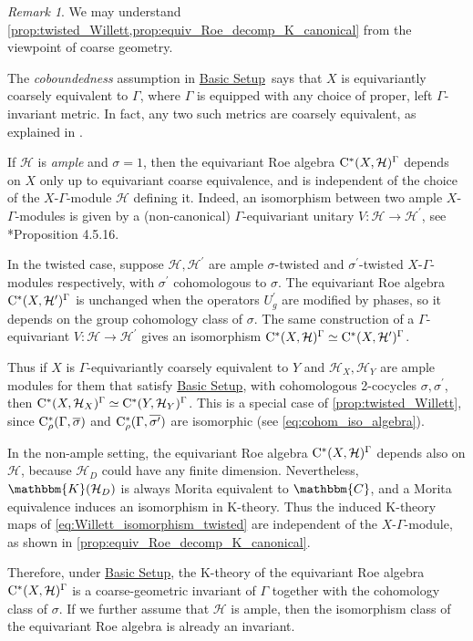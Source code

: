 \documentclass{amsart}
\numberwithin{figure}{section}
\numberwithin{equation}{section}
\numberwithin{table}{section}
\theoremstyle{plain}
\theoremstyle{definition}
\theoremstyle{remark}
\newtheorem{remark}[equation]{Remark}
\theoremstyle{nonumber}
\newcommand{\refbasicsetup}{\hyperref[basic_setup]{Basic Setup}}
\newcommand{\C}{\mathbb{C}}
\newcommand{\Cpt}{\mathbb{K}}
\newcommand{\Cst}{\relax\ifmmode\mathrm{C}^*\else\textup{C*}\fi}
\newcommand{\Cstr}{\Cst_\rho} %
\renewcommand{\mathbb}{\mathbbm} %
\begin{document}
\begin{remark}\label{rmk:equivariant_coarse_equivalence}
We may understand
\cref{prop:twisted_Willett,prop:equiv_Roe_decomp_K_canonical}
from the viewpoint of coarse geometry.

The \emph{coboundedness} assumption in \refbasicsetup\, says that \( X \) is
equivariantly coarsely equivalent to \( \Gamma \), where \( \Gamma \) is
equipped with any choice of proper, left \( \Gamma \)-invariant metric.
In fact, any two such metrics are coarsely equivalent, as explained in
\cite{Smith:Asymptotic_dimension_abelian_groups}.

If \( \mathcal{H} \) is \emph{ample} 
and $\sigma=1$, then the equivariant Roe algebra \(
\Cst(X,\mathcal{H})^\Gamma \) depends on \( X \) only up to equivariant
coarse equivalence, and is independent of the choice of the \( X \)-\(
\Gamma \)-module \( \mathcal{H} \) defining it. 
Indeed, an isomorphism between two ample \( X \)-\(
\Gamma \)-modules is given by a (non-canonical) \( \Gamma \)-equivariant
unitary $V\colon \mathcal{H}\to\mathcal{H}^\prime$, see
\cite{Willett-Yu:Higher_index_theory}*{Proposition 4.5.16}.

In the twisted case, suppose $\mathcal{H},\mathcal{H}^\prime$ are
ample $\sigma$-twisted and $\sigma^\prime$-twisted $X$-$\Gamma$-modules
respectively, with $\sigma^\prime$ cohomologous to $\sigma$. The
equivariant Roe algebra \( \Cst(X,\mathcal{H}^\prime)^\Gamma \) is
unchanged when the operators $U^\prime_g$ are modified by phases, so it depends on the group cohomology class of $\sigma$. The same construction of a
$\Gamma$-equivariant $V\colon \mathcal{H}\to \mathcal{H}^\prime$ gives an
isomorphism \(\Cst(X,\mathcal{H})^\Gamma \simeq
\Cst(X,\mathcal{H}^\prime)^\Gamma\). 

Thus if
\( X \) is \(\Gamma\)-equivariantly coarsely equivalent to \( Y \) and
\( \mathcal{H}_X, \mathcal{H}_Y\) are ample modules for them that satisfy
\refbasicsetup, with cohomologous 2-cocycles $\sigma,\sigma^\prime$,
then \(
\Cst(X,\mathcal{H}_X)^\Gamma\simeq\Cst(Y,\mathcal{H}_Y)^\Gamma \). This is
a special case of \cref{prop:twisted_Willett}, since $\Cstr(\Gamma,\overline{\sigma})$ and
$\Cstr(\Gamma,\overline{\sigma^\prime})$ are isomorphic (see
\eqref{eq:cohom_iso_algebra}).

In the non-ample setting, the equivariant Roe algebra
\( \Cst(X,\mathcal{H})^\Gamma \) depends also on \( \mathcal{H} \),
because \( \mathcal{H}_D \) could have any finite dimension.
Nevertheless, \( \Cpt(\mathcal{H}_D) \)
is always Morita equivalent to \( \C \), and a Morita equivalence induces
an isomorphism in K-theory. Thus the induced K-theory maps of
\eqref{eq:Willett_isomorphism_twisted} are independent of the \( X \)-\(
\Gamma \)-module, as shown in \cref{prop:equiv_Roe_decomp_K_canonical}.

Therefore, under \refbasicsetup, the K-theory of the 
equivariant Roe algebra \(\Cst(X,\mathcal{H})^\Gamma \) is
a coarse-geometric invariant of \( \Gamma \) together with 
the cohomology class of
$\sigma$. If we further assume that 
\( \mathcal{H} \) is ample, then the isomorphism class of the
equivariant Roe algebra is already an invariant.
\end{remark}
\end{document}
